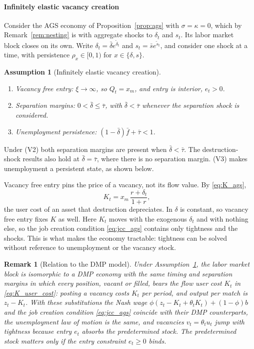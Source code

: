 \documentclass[authoryear, review, 12pt]{elsarticle}
\newtheorem{remark}{Remark}
\newtheorem{assumption}{Assumption}
\begin{document}
\paragraph{Infinitely elastic vacancy creation}
Consider the AGS economy of Proposition~\ref{prop:ags} with $\sigma=\kappa=0$, which by
Remark~\ref{rem:nesting} is \citet{gabrovski_2025} with aggregate shocks to $\delta_t$ and
$s_t$. Its labor market block closes on its own. Write $\delta_t=\bar\delta e^{\tilde\delta_t}$
and $s_t=\bar{s}e^{\tilde{s}_t}$, and consider one shock at a time, with persistence
$\rho_x\in[0,1)$ for $x\in\{\delta,s\}$.

\begin{assumption}[Infinitely elastic vacancy creation]\label{ass:vacancy_fe}
	\leavevmode
	\begin{enumerate}
		\item[(V1)] \emph{Vacancy free entry:} $\xi\to\infty$, so $Q_t=x_m$, and entry is
		interior, $e_t>0$.
		\item[(V2)] \emph{Separation margins:} $0<\bar\delta\leq\bar\tau$, with
		$\bar\delta<\bar\tau$ whenever the separation shock is considered.
		\item[(V3)] \emph{Unemployment persistence:} $(1-\bar\delta)\bar{f}+\bar\tau<1$.
	\end{enumerate}
\end{assumption}
\noindent Under (V2) both separation margins are present when $\bar\delta<\bar\tau$. The
destruction-shock results also hold at $\bar\delta=\bar\tau$, where there is no separation
margin. (V3) makes unemployment a persistent state, as shown below.

Vacancy free entry pins the price of a vacancy, not its flow value. By \eqref{eq:K_ags},
\begin{equation}\label{eq:K_user_cost}
	K_t=x_m\,\frac{r+\delta_t}{1+r},
\end{equation}
the user cost of an asset that destruction depreciates. In \citet{gabrovski_2025}
$\delta$ is constant, so vacancy free entry fixes $K$ as well. Here $K_t$ moves with the
exogenous $\delta_t$ and with nothing else, so the job creation condition
\eqref{eq:jcc_ags} contains only tightness and the shocks. This is what makes the
economy tractable: tightness can be solved without reference to unemployment or the
vacancy stock.

\begin{remark}[Relation to the DMP model]\label{rem:dmp}
Under Assumption~\ref{ass:vacancy_fe}, the labor market block is isomorphic to a DMP economy
with the same timing and separation margins in which every position, vacant or filled,
bears the flow user cost $K_t$ in \eqref{eq:K_user_cost}: posting a vacancy costs $K_t$ per
period, and output per match is $z_t-K_t$. With these substitutions the Nash wage
$\phi(z_t-K_t+\theta_tK_t)+(1-\phi)b$ and the job creation condition \eqref{eq:jcc_ags}
coincide with their DMP counterparts, the unemployment law of motion is the same, and
vacancies $v_t=\theta_tu_t$ jump with tightness because entry $e_t$ absorbs the
predetermined stock. The predetermined stock matters only if the entry constraint
$e_t\geq0$ binds.
\end{remark}
\end{document}
